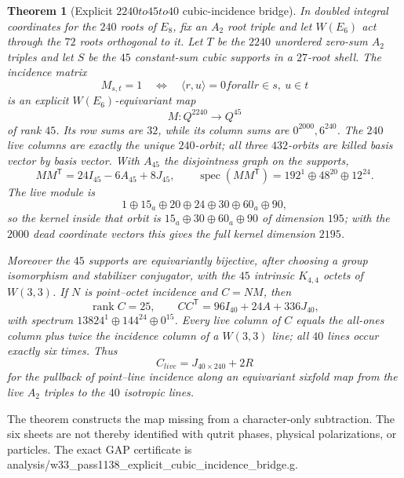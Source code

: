 \documentclass[12pt,a4paper]{article}
\def\mathbb#1{#1}%
\def\mathrm#1{#1}%
\def\mathcal#1{#1}%
\def\texttt#1{#1}%
\def\text#1{#1}%
\def\to{ to }%
\newtheorem{theorem}{Theorem}[section]
\theoremstyle{definition}
\begin{document}
\begin{theorem}[Explicit $2240\to45\to40$ cubic-incidence bridge]
\label{thm:explicit-cubic-incidence-bridge}
In doubled integral coordinates for the $240$ roots of $E_8$, fix an
$A_2$ root triple and let $W(E_6)$ act through the $72$ roots orthogonal
to it.  Let $\mathcal T$ be the $2240$ unordered zero-sum $A_2$ triples
and let $\mathcal S$ be the $45$ constant-sum cubic supports in a
$27$-root shell.  The incidence matrix
\[
 M_{s,t}=1
 \quad\Longleftrightarrow\quad
 \langle r,u\rangle=0
 \text{ for all }r\in s,\ u\in t
\]
is an explicit $W(E_6)$-equivariant map
\[
 M:\mathbb Q^{2240}\longrightarrow\mathbb Q^{45}
\]
of rank $45$.  Its row sums are $32$, while its column sums are
$0^{2000},6^{240}$.  The $240$ live columns are exactly the unique
$240$-orbit; all three $432$-orbits are killed basis vector by basis
vector.  With $A_{45}$ the disjointness graph on the supports,
\[
 \boxed{MM^{\mathsf T}=24I_{45}-6A_{45}+8J_{45}},
 \qquad
 \operatorname{spec}(MM^{\mathsf T})
 =192^1\oplus48^{20}\oplus12^{24}.
\]
The live module is
\[
 1\oplus15_a\oplus20\oplus24\oplus30\oplus60_a\oplus90,
\]
so the kernel inside that orbit is
$15_a\oplus30\oplus60_a\oplus90$ of dimension $195$; with the
$2000$ dead coordinate vectors this gives the full kernel dimension
$2195$.

Moreover the $45$ supports are equivariantly bijective, after choosing a
group isomorphism and stabilizer conjugator, with the $45$ intrinsic
$K_{4,4}$ octets of $W(3,3)$.  If $N$ is point--octet incidence and
$C=NM$, then
\[
 \operatorname{rank}C=25,\qquad
 \boxed{CC^{\mathsf T}=96I_{40}+24A+336J_{40}},
\]
with spectrum $13824^1\oplus144^{24}\oplus0^{15}$.  Every live column of
$C$ equals the all-ones column plus twice the incidence column of a
$W(3,3)$ line; all $40$ lines occur exactly six times.  Thus
\[
 C_{\mathrm{live}}=J_{40\times240}+2R
\]
for the pullback of point--line incidence along an equivariant sixfold
map from the live $A_2$ triples to the $40$ isotropic lines.
\end{theorem}

\noindent
The theorem constructs the map missing from a character-only subtraction.
The six sheets are not thereby identified with qutrit phases, physical
polarizations, or particles.  The exact GAP certificate is
\texttt{analysis/w33\_pass1138\_explicit\_cubic\_incidence\_bridge.g}.
\end{document}
